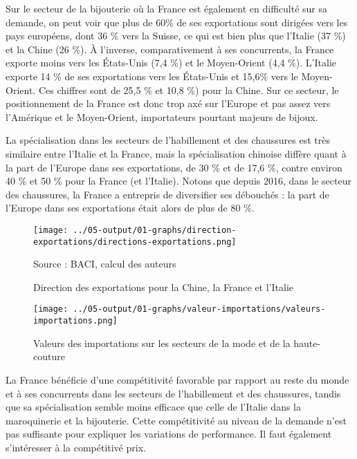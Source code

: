 \documentclass[french,10pt,a4paper]{article}
\begin{document}
Sur le secteur de la bijouterie où la France est également en difficulté sur sa demande, on peut voir que plus de 60\% de ses exportations sont dirigées vers les pays européens, dont 36 \% vers la Suisse, ce qui est bien plus que l'Italie (37 \%) et la Chine (26 \%). À l'inverse, comparativement à ses concurrents, la France exporte moins vers les États-Unis (7,4 \%) et le Moyen-Orient (4,4 \%). L'Italie exporte 14 \% de ses exportations vers les États-Unis et 15,6\% vers le Moyen-Orient. Ces chiffres sont de 25,5 \% et 10,8 \%) pour la Chine. Sur ce secteur, le positionnement de la France est donc trop axé sur l'Europe et pas assez vers l'Amérique et le Moyen-Orient, importateurs pourtant majeurs de bijoux.

La spécialisation dans les secteurs de l'habillement et des chaussures est très similaire entre l'Italie et la France, mais la spécialisation chinoise diffère quant à la part de l'Europe dans ses exportations, de 30 \% et de 17,6 \%, contre environ 40 \% et 50 \% pour la France (et l’Italie). Notons que depuis 2016, dans le secteur des chaussures, la France a entrepris de diversifier ses débouchés : la part de l'Europe dans ses exportations était alors de plus de 80 \%. 

\begin{figure}[!h]
  \centering
  \texttt{[image: ../05-output/01-graphs/direction-exportations/directions-exportations.png]}
  \captionsetup{justification=raggedright,singlelinecheck=false, font=small}
  \caption*{Source : BACI, calcul des auteurs}
  \captionsetup{justification=centering, singlelinecheck=true, font=normalsize}
  \caption{Direction des exportations pour la Chine, la France et l'Italie}
  \label{fig:direction-exportations}
\end{figure}

\begin{figure}[!h]
  \centering
  \texttt{[image: ../05-output/01-graphs/valeur-importations/valeurs-importations.png]}
  \caption{Valeurs des importations sur les secteurs de la mode et de la haute-couture}
  \label{fig:valeurs-importations}
\end{figure}

La France bénéficie d'une compétitivité favorable par rapport au reste du monde et à ses concurrents dans les secteurs de l'habillement et des chaussures, tandis que sa spécialisation semble moins efficace que celle de l'Italie dans la maroquinerie et la bijouterie. Cette compétitivité au niveau de la demande n'est pas suffisante pour expliquer les variations de performance. Il faut également s'intéresser à la compétitivé prix.
\end{document}

